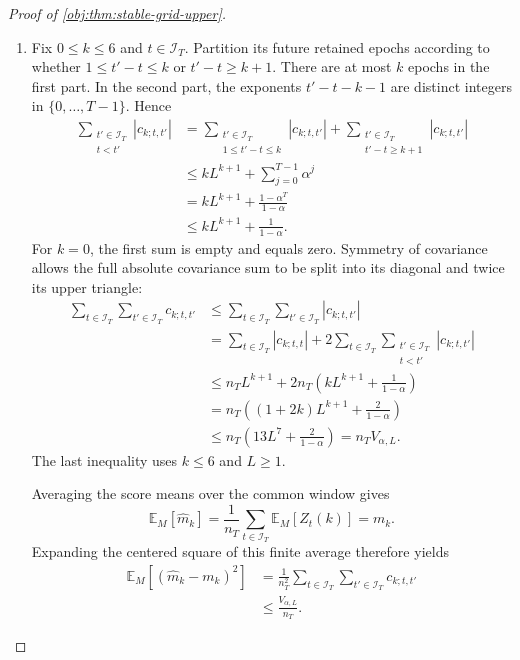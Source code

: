 \begin{proof}[Proof of \cref{obj:thm:stable-grid-upper}]
\begin{enumerate}
\item Fix \(0\le k\le6\) and \(t\in\mathcal I_T\). Partition its future retained epochs according to whether \(1\le t'-t\le k\) or \(t'-t\ge k+1\). There are at most \(k\) epochs in the first part. In the second part, the exponents \(t'-t-k-1\) are distinct integers in \(\{0,\ldots,T-1\}\). Hence
\[
\begin{aligned}
\sum_{\substack{t'\in\mathcal I_T\\t<t'}}
 |c_{k;t,t'}|
&=
\sum_{\substack{t'\in\mathcal I_T\\1\le t'-t\le k}}
 |c_{k;t,t'}|
+
\sum_{\substack{t'\in\mathcal I_T\\t'-t\ge k+1}}
 |c_{k;t,t'}|\\
&\le
kL^{k+1}+\sum_{j=0}^{T-1}\alpha^j\\
&=
kL^{k+1}+\frac{1-\alpha^T}{1-\alpha}\\
&\le
kL^{k+1}+\frac1{1-\alpha}.
\end{aligned}
\]
For \(k=0\), the first sum is empty and equals zero. Symmetry of covariance allows the full absolute covariance sum to be split into its diagonal and twice its upper triangle:
\[
\begin{aligned}
\sum_{t\in\mathcal I_T}\sum_{t'\in\mathcal I_T}c_{k;t,t'}
&\le
\sum_{t\in\mathcal I_T}\sum_{t'\in\mathcal I_T}|c_{k;t,t'}|\\
&=
\sum_{t\in\mathcal I_T}|c_{k;t,t}|
+
2\sum_{t\in\mathcal I_T}
 \sum_{\substack{t'\in\mathcal I_T\\t<t'}}
 |c_{k;t,t'}|\\
&\le
n_TL^{k+1}
+
2n_T\left(kL^{k+1}+\frac1{1-\alpha}\right)\\
&=
n_T\left((1+2k)L^{k+1}+\frac2{1-\alpha}\right)\\
&\le
n_T\left(13L^7+\frac2{1-\alpha}\right)
=
n_TV_{\alpha,L}.
\end{aligned}
\]
The last inequality uses \(k\le6\) and \(L\ge1\).

Averaging the score means over the common window gives
\[
\mathbb E_M[\widehat m_k]
=
\frac1{n_T}\sum_{t\in\mathcal I_T}\mathbb E_M[Z_t(k)]
=
m_k.
\]
Expanding the centered square of this finite average therefore yields
\[
\begin{aligned}
\mathbb E_M[(\widehat m_k-m_k)^2]
&=
\frac1{n_T^2}
\sum_{t\in\mathcal I_T}\sum_{t'\in\mathcal I_T}c_{k;t,t'}\\
&\le
\frac{V_{\alpha,L}}{n_T}.
\end{aligned}
\]


\end{enumerate}
\end{proof}
